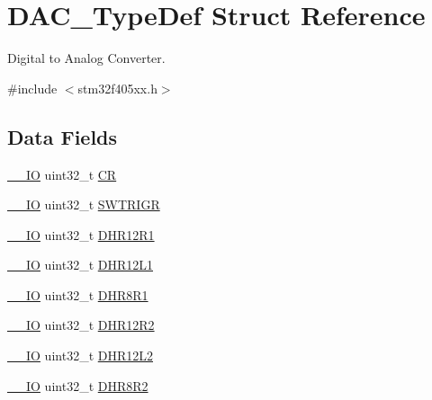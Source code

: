 \hypertarget{struct_d_a_c___type_def}{}\section{D\+A\+C\+\_\+\+Type\+Def Struct Reference}
\label{struct_d_a_c___type_def}


Digital to Analog Converter.  




{\ttfamily \#include $<$stm32f405xx.\+h$>$}

\subsection*{Data Fields}
\begin{DoxyCompactItemize}
\item 
\hyperlink{core__sc300_8h_aec43007d9998a0a0e01faede4133d6be}{\+\_\+\+\_\+\+IO} uint32\+\_\+t \hyperlink{struct_d_a_c___type_def_ab40c89c59391aaa9d9a8ec011dd0907a}{CR}
\item 
\hyperlink{core__sc300_8h_aec43007d9998a0a0e01faede4133d6be}{\+\_\+\+\_\+\+IO} uint32\+\_\+t \hyperlink{struct_d_a_c___type_def_a896bbb7153af0b67ad772360feaceeb4}{S\+W\+T\+R\+I\+GR}
\item 
\hyperlink{core__sc300_8h_aec43007d9998a0a0e01faede4133d6be}{\+\_\+\+\_\+\+IO} uint32\+\_\+t \hyperlink{struct_d_a_c___type_def_ac2bb55b037b800a25852736afdd7a258}{D\+H\+R12\+R1}
\item 
\hyperlink{core__sc300_8h_aec43007d9998a0a0e01faede4133d6be}{\+\_\+\+\_\+\+IO} uint32\+\_\+t \hyperlink{struct_d_a_c___type_def_ae9028b8bcb5118b7073165fb50fcd559}{D\+H\+R12\+L1}
\item 
\hyperlink{core__sc300_8h_aec43007d9998a0a0e01faede4133d6be}{\+\_\+\+\_\+\+IO} uint32\+\_\+t \hyperlink{struct_d_a_c___type_def_ad0a200e12acad17a5c7d2059159ea7e1}{D\+H\+R8\+R1}
\item 
\hyperlink{core__sc300_8h_aec43007d9998a0a0e01faede4133d6be}{\+\_\+\+\_\+\+IO} uint32\+\_\+t \hyperlink{struct_d_a_c___type_def_a804c7e15dbb587c7ea25511f6a7809f7}{D\+H\+R12\+R2}
\item 
\hyperlink{core__sc300_8h_aec43007d9998a0a0e01faede4133d6be}{\+\_\+\+\_\+\+IO} uint32\+\_\+t \hyperlink{struct_d_a_c___type_def_a2e45f9c9d67e384187b25334ba0a3e3d}{D\+H\+R12\+L2}
\item 
\hyperlink{core__sc300_8h_aec43007d9998a0a0e01faede4133d6be}{\+\_\+\+\_\+\+IO} uint32\+\_\+t \hyperlink{struct_d_a_c___type_def_a4c435f0e34ace4421241cd5c3ae87fc2}{D\+H\+R8\+R2}

\end{DoxyCompactItemize}
